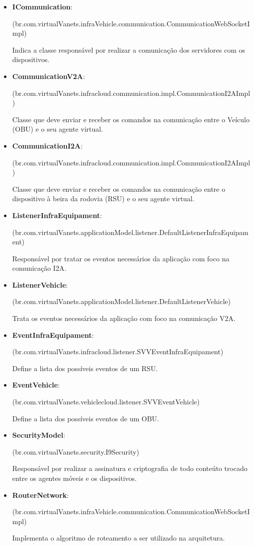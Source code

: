 \documentclass[
	12pt,				%
	oneside,			%
	a4paper,			%
	english,			%
	brazil				%
	]{abntex2ppgsi}
\begin{document}
\begin{itemize}
	\item{\textbf{ICommunication}:		
		
		 (br.com.virtualVanets.infraVehicle.communication.CommunicationWebSocketImpl) 
		 
		 Indica a classe responsável por realizar a comunicação dos servidores com os dispositivos.
		 }	
	\item{\textbf{CommunicationV2A}:
		
		(br.com.virtualVanets.infracloud.communication.impl.CommunicationI2AImpl)
		
		Classe que deve enviar e receber os comandos na comunicação entre o Veículo (OBU) e o seu agente virtual.
		}	
	\item{\textbf{CommunicationI2A}:
		
		(br.com.virtualVanets.infracloud.communication.impl.CommunicationI2AImpl)
		
		Classe que deve enviar e receber os comandos na comunicação entre o dispositivo à beira da rodovia (RSU) e o seu agente virtual.
		}	
	\item{\textbf{ListenerInfraEquipament}:
		
		(br.com.virtualVanets.applicationModel.listener.DefaultListenerInfraEquipament)
		
		Responsável por tratar os eventos necessários da aplicação com foco na comunicação I2A.
		}	
	\item{\textbf{ListenerVehicle}:
		
		(br.com.virtualVanets.applicationModel.listener.DefaultListenerVehicle)
		
		Trata os eventos necessários da aplicação com foco na comunicação V2A.
		}	
	\item{\textbf{EventInfraEquipament}:
		
		(br.com.virtualVanets.infracloud.listener.SVVEventInfraEquipament)
		
		Define a lista dos possíveis eventos de um RSU.
		}	
	\item{\textbf{EventVehicle}:
		
		(br.com.virtualVanets.vehiclecloud.listener.SVVEventVehicle)
		
		Define a lista dos possíveis eventos de um OBU.
		}	
	\item{\textbf{SecurityModel}:
		
		(br.com.virtualVanets.security.I9Security)
		
		Responsável por realizar a assinatura e criptografia de todo conteúto trocado entre os agentes móveis e os dispositivos.
		}	
	\item{\textbf{RouterNetwork}:
		
		(br.com.virtualVanets.infraVehicle.communication.CommunicationWebSocketImpl)
		
		Implementa o algoritmo de roteamento a ser utilizado na arquitetura.
		}	

\end{itemize} 
\end{document}

